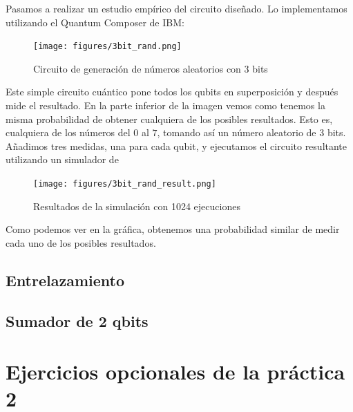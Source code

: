 \documentclass[11pt]{article}
\begin{document}
Pasamos a realizar un estudio empírico del circuito diseñado. Lo implementamos utilizando el Quantum Composer de IBM:

\begin{figure}[H]
	\centering
	\texttt{[image: figures/3bit\_rand.png]}
	\caption{Circuito de generación de números aleatorios con 3 bits}
\end{figure}

Este simple circuito cuántico pone todos los qubits en superposición y después mide el resultado. En la parte inferior de la imagen vemos como tenemos la misma probabilidad de obtener cualquiera de los posibles resultados. Esto es, cualquiera de los números del $0$ al $7$, tomando así un número aleatorio de 3 bits. Añadimos tres medidas, una para cada qubit, y ejecutamos el circuito resultante utilizando un simulador de 

\begin{figure}[H]
	\centering
	\texttt{[image: figures/3bit\_rand\_result.png]}
	\caption{Resultados de la simulación con 1024 ejecuciones}
\end{figure}

Como podemos ver en la gráfica, obtenemos una probabilidad similar de medir cada uno de los posibles resultados.

\subsection{Entrelazamiento}



\subsection{Sumador de 2 qbits}



\section{Ejercicios opcionales de la práctica 2}
\end{document}
